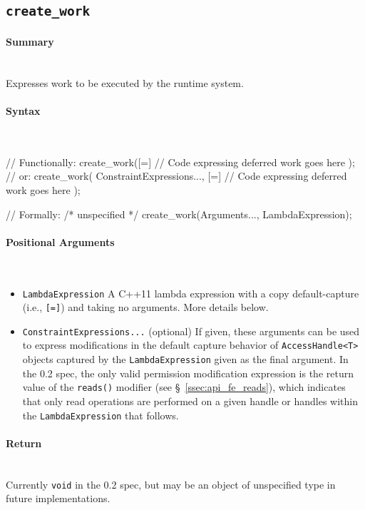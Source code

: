 \subsection{\texttt{create\_work}}
\label{ssec:api_fe_cw}

\paragraph{Summary}\mbox{}\\
Expresses work to be executed by the runtime system.

\paragraph{Syntax}\mbox{}\\
\begin{CppCode}
// Functionally:
create_work([=]{
  // Code expressing deferred work goes here
});
// or:
create_work(
  ConstraintExpressions..., 
  [=]{
    // Code expressing deferred work goes here
  }
);

// Formally:
/* unspecified */ create_work(Arguments..., LambdaExpression);
\end{CppCode}

\paragraph{Positional Arguments}\mbox{}\\
\begin{itemize}
  \item \texttt{LambdaExpression} A C++11 lambda expression with a copy
  default-capture (i.e., \texttt{[=]}) and taking no arguments.  More details
  below.
  \item \texttt{ConstraintExpressions...} (optional) If given, these
  arguments can be used to express modifications in the default capture behavior
  of \texttt{AccessHandle<T>} objects captured by the \texttt{LambdaExpression}
  given as the final argument.  In the 0.2 spec, the only valid permission
  modification expression is the return value of the \texttt{reads()} modifier
  (see \S~\ref{ssec:api_fe_reads}), which indicates that only read operations
  are performed on a given handle or handles within the
  \texttt{LambdaExpression} that follows.
\end{itemize}


\paragraph{Return}\mbox{}\\
Currently \texttt{void} in the 0.2 spec, but may be an object of unspecified
type in future implementations.

